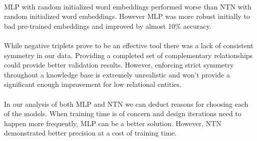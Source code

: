 \documentclass[11.5pt]{article}
\begin{document}
\paragraph{} MLP with random initialized word embeddings performed worse than NTN with random initialized word embeddings. However MLP was more robust initially to bad pre-trained embeddings and improved by almost 10\% accuracy. 

\paragraph{} While negative triplets prove to be an effective tool there was a lack of consistent symmetry in our data. Providing a completed set of complementary relationships could provide better validation results. However, enforcing strict symmetry throughout a knowledge base is extremely unrealistic and won't provide a significant enough improvement for low relational entities.

\paragraph{} In our analysis of both MLP and NTN we can deduct reasons for choosing each of the models. When training time is of concern and design iterations need to happen more frequently, MLP can be a better solution. However, NTN demonstrated better precision at a cost of training time.

\pagebreak

{}

\pagebreak
\end{document}
